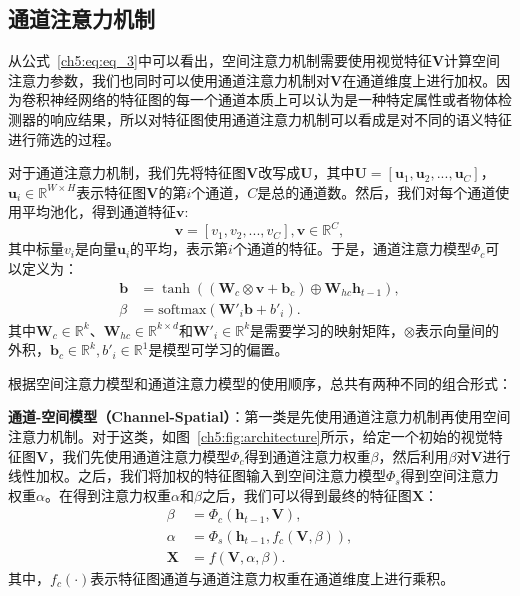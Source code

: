 \subsection{通道注意力机制}
从公式~\ref{ch5:eq:eq_3}中可以看出，空间注意力机制需要使用视觉特征$\bm{V}$计算空间注意力参数，我们也同时可以使用通道注意力机制对$\bm{V}$在通道维度上进行加权。因为卷积神经网络的特征图的每一个通道本质上可以认为是一种特定属性或者物体检测器的响应结果，所以对特征图使用通道注意力机制可以看成是对不同的语义特征进行筛选的过程。

对于通道注意力机制，我们先将特征图$\bm{V}$改写成$\bm{U}$，其中$\bm{U} = [\bm{u}_1, \bm{u}_2, ..., \bm{u}_C]$，$\bm{u}_i \in \mathbb{R}^{W \times H}$表示特征图$\bm{V}$的第$i$个通道，$C$是总的通道数。然后，我们对每个通道使用平均池化，得到通道特征$\bm{v}$:
\begin{equation}
\bm{v} = \left[v_1, v_2, ..., v_C \right], \bm{v} \in \mathbb{R}^{C},
\end{equation}
其中标量$v_i$是向量$\bm{u}_i$的平均，表示第$i$个通道的特征。于是，通道注意力模型$\Phi_c$可以定义为：
\begin{equation} \label{ch5:eq:eq_7}
\begin{split}
\bm{b} & = \tanh \left(\left(\bm{W}_c \otimes \bm{v} + \bm{b}_c \right) \oplus \bm{W}_{hc}\bm{h}_{t-1} \right), \\
\beta & = \textrm{softmax} \left(\bm{W'}_i \bm{b} + {b'}_i \right).
\end{split}
\end{equation}
其中$\bm{W}_c \in \mathbb{R}^k$、$\bm{W}_{hc} \in \mathbb{R}^{k \times d}$和$\bm{W'}_i \in \mathbb{R}^k$是需要学习的映射矩阵，$\otimes$表示向量间的外积，$\bm{b}_c \in \mathbb{R}^k, {b'}_i \in \mathbb{R}^1$是模型可学习的偏置。


根据空间注意力模型和通道注意力模型的使用顺序，总共有两种不同的组合形式：

\textbf{通道-空间模型（Channel-Spatial）}：第一类是先使用通道注意力机制再使用空间注意力机制。对于这类，如图~\ref{ch5:fig:architecture}所示，给定一个初始的视觉特征图$\bm{V}$，我们先使用通道注意力模型$\Phi_c$得到通道注意力权重$\beta$，然后利用$\beta$对$\bm{V}$进行线性加权。之后，我们将加权的特征图输入到空间注意力模型$\Phi_s$得到空间注意力权重$\alpha$。在得到注意力权重$\alpha$和$\beta$之后，我们可以得到最终的特征图$\bm{X}$：
\begin{equation} \label{ch5:eq:eq_8}
\begin{split}
\beta &= \Phi_c \left(\bm{h}_{t-1},\bm{V} \right), \\
\alpha &= \Phi_s \left(\bm{h}_{t-1}, f_c \left(\bm{V}, \beta \right) \right), \\
\bm{X} &= f \left(\bm{V}, \alpha, \beta \right).
\end{split}
\end{equation}
其中，$f_c(\cdot)$表示特征图通道与通道注意力权重在通道维度上进行乘积。


